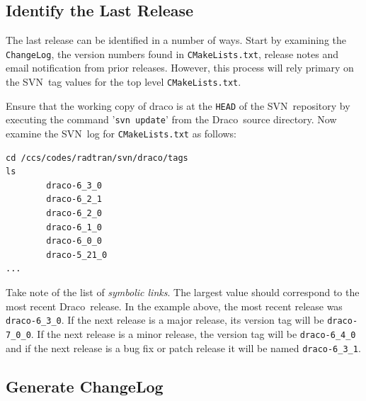 \documentclass[note]{newmemo}
\newcommand{\draco}{{\normalfont\small\sffamily Draco}}
\newcommand{\svn}{\textsf{SVN}}
\begin{document}

\subsection{Identify the Last Release}
\label{sec:last_rel}

The last release can be identified in a number of ways.  Start by
examining the \texttt{ChangeLog}, the version numbers found in
\texttt{CMakeLists.txt}, release notes and email notification from
prior releases.  However, this process will rely primary on the
\svn\ tag values for the top level \texttt{CMakeLists.txt}.

Ensure that the working copy of draco is at the \texttt{HEAD} of the
\svn\ repository by executing the command '\texttt{svn update}' from
the \draco\ source directory.  Now examine the \svn\ log for
\texttt{CMakeLists.txt} as follows:
%
\begin{lstlisting}[basicstyle=\footnotesize, xleftmargin=1.0in, 
  xrightmargin=1.0in]
cd /ccs/codes/radtran/svn/draco/tags
ls
        draco-6_3_0
        draco-6_2_1
        draco-6_2_0
        draco-6_1_0
        draco-6_0_0
        draco-5_21_0
...
\end{lstlisting}


%
Take note of the list of {\it symbolic links}.  The largest value
should correspond to the most recent \draco\ release.  In the example
above, the most recent release was \texttt{draco-6\_3\_0}.  If the
next release is a major release, its version tag will be
\texttt{draco-7\_0\_0}.  If the next release is a minor release, the
version tag will be \texttt{draco-6\_4\_0} and if the next release is
a bug fix or patch release it will be named \texttt{draco-6\_3\_1}.


\subsection{Generate ChangeLog}
\label{sec:changelog}
\end{document}
